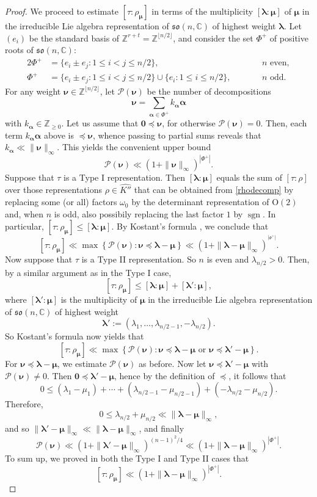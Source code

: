 \documentclass[11pt,oneside]{amsart}
\numberwithin{equation}{section}
\theoremstyle{remark}
\theoremstyle{plain}
\DeclareMathOperator{\sgn}{sgn}
\newcommand\OO{\mathrm{O}}
\newcommand\ZZ{\mathbb{Z}}
\newcommand\CC{\mathbb{C}}
\newcommand{\mcP}{\mathcal{P}}
\renewcommand\leq{\leqslant}
\renewcommand\geq{\geqslant}
\begin{document}
\begin{proof}
We proceed to estimate $[\tau:\rho_{\bm\mu}]$ in terms of the multiplicity $[\bm\lambda:\bm\mu]$ of $\bm\mu$ in the irreducible Lie algebra representation of $\mathfrak{so}(n,\CC)$ of highest weight $\bm\lambda$. Let $(e_i)$ be the standard basis of $\ZZ^{r+t}=\ZZ^{\lfloor n/2\rfloor}$, and consider the set $\Phi^+$ of positive roots of $\mathfrak{so}(n,\CC)$:
\begin{alignat*}{2}
\Phi^+&=\{e_i\pm e_j:1\leq i<j\leq n/2\},\qquad&&\text{$n$ even},\\
\Phi^+&=\{e_i\pm e_j:1\leq i<j\leq n/2\}\cup\{e_i:1\leq i\leq n/2\},\qquad&&\text{$n$ odd}.
\end{alignat*}
For any weight $\bm\nu\in\ZZ^{\lfloor n/2\rfloor}$, let $\mcP(\bm\nu)$ be the number of decompositions
\[\bm\nu=\sum_{\bm\alpha\in\Phi^+}k_{\bm\alpha}\bm\alpha\]
with $k_{\bm\alpha}\in\ZZ_{\geq 0}$. Let us assume that $\mathbf{0}\preceq\bm\nu$, for otherwise $\mcP(\bm\nu)=0$. Then, each term $k_{\bm\alpha}\bm\alpha$ above is $\preceq\bm\nu$, whence passing to partial sums reveals that
$k_{\bm\alpha}\ll\|\bm\nu\|_\infty$. This yields the convenient upper bound
\[\mcP(\bm\nu)\ll(1+\|\bm\nu\|_{\infty})^{|\Phi^+|}.\]
Suppose that $\tau$ is a Type I representation. Then $[\bm\lambda:\bm\mu]$ equals the sum of $[\tau:\rho]$ over those representations $\rho\in\widehat{K''}$ that can be obtained from \eqref{rhodecomp} by replacing some (or all) factors $\omega_0$ by the determinant representation of $\OO(2)$ and, when $n$ is odd, also possibily replacing the last factor $1$ by $\sgn$. In particular,
$[\tau:\rho_{\bm\mu}]\leq[\bm\lambda:\bm\mu]$. By Kostant's formula \cite[Cor.~5.83]{Knapp-Lie}, we conclude that
\[[\tau:\rho_{\bm\mu}]\ll\max\left\{\mcP(\bm\nu):\bm\nu\preceq\bm\lambda-\bm\mu\right\}
\ll(1+\|\bm\lambda-\bm\mu\|_\infty)^{^{|\Phi^+|}}.\]
Now suppose that $\tau$ is a Type II representation. So $n$ is even and $\lambda_{n/2}>0$. Then, by a similar argument as in the Type I case,
\[[\tau:\rho_{\bm\mu}]\leq[\bm\lambda:\bm\mu]+[\bm\lambda':\bm\mu],\]
where $[\bm\lambda':\bm\mu]$ is the multiplicity of $\bm\mu$ in the irreducible Lie algebra representation of $\mathfrak{so}(n,\CC)$ of highest weight
\[\bm\lambda':=(\lambda_1,\dotsc,\lambda_{n/2-1},-\lambda_{n/2}).\]
So Kostant's formula now yields that
\[[\tau:\rho_{\bm\mu}]\ll\max\left\{\mcP(\bm\nu):\text{$\bm\nu\preceq\bm\lambda-\bm\mu$ or $\bm\nu\preceq\bm\lambda'-\bm\mu$}\right\}.\]
For $\bm\nu\preceq\bm\lambda-\bm\mu$, we estimate $\mcP(\bm\nu)$ as before. Now let $\bm\nu\preceq\bm\lambda'-\bm\mu$ with $\mcP(\bm\nu)\neq 0$. Then $\mathbf{0}\preceq\bm\lambda'-\bm\mu$, hence by the definition of $\preceq$, it follows that
\[0\leq(\lambda_1-\mu_1)+\dotsb+(\lambda_{n/2-1}-\mu_{n/2-1})+(-\lambda_{n/2}-\mu_{n/2}).\]
Therefore,
\[0\leq\lambda_{n/2}+\mu_{n/2}\ll\|\bm\lambda-\bm\mu\|_\infty,\]
and so $\|\bm\lambda'-\bm\mu\|_\infty\ll\|\bm\lambda-\bm\mu\|_\infty$, and finally
\[\mcP(\bm\nu)\ll(1+\|\bm\lambda'-\bm\mu\|_\infty)^{(n-1)^2/4}\ll(1+\|\bm\lambda-\bm\mu\|_\infty)^{|\Phi^+|}.\]
To sum up, we proved in both the Type I and Type II cases that
\[[\tau:\rho_{\bm\mu}]\ll(1+\|\bm\lambda-\bm\mu\|_\infty)^{|\Phi^+|}.\]


\end{proof}
\end{document}
